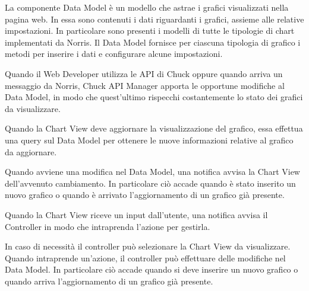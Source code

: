     	La componente Data Model è un modello che astrae i grafici visualizzati nella pagina web. In essa sono contenuti i dati riguardanti i grafici, assieme alle relative impostazioni. In particolare sono presenti i modelli di tutte le tipologie di chart implementati da Norris. Il Data Model fornisce per ciascuna tipologia di grafico i metodi per inserire i dati e configurare alcune impostazioni. 
    
	
		Quando il Web Developer utilizza le API di Chuck oppure quando arriva un messaggio da Norris, Chuck API Manager apporta le opportune modifiche al Data Model, in modo che quest'ultimo rispecchi costantemente lo stato dei grafici da visualizzare.

		Quando la Chart View deve aggiornare la visualizzazione del grafico, essa effettua una query sul Data Model per ottenere le nuove informazioni relative al grafico da aggiornare.

		Quando avviene una modifica nel Data Model, una notifica avvisa la Chart View dell'avvenuto cambiamento. In particolare ciò accade quando è stato inserito un nuovo grafico o quando è arrivato l'aggiornamento di un grafico già presente.

		Quando la Chart View riceve un input dall'utente, una notifica avvisa il Controller in modo che intraprenda l'azione per gestirla.

		In caso di necessità il controller può selezionare la Chart View da visualizzare.
		Quando intraprende un'azione, il controller può effettuare delle modifiche nel Data Model. In particolare ciò accade quando si deve inserire un nuovo grafico o quando arriva l'aggiornamento di un grafico già presente.
